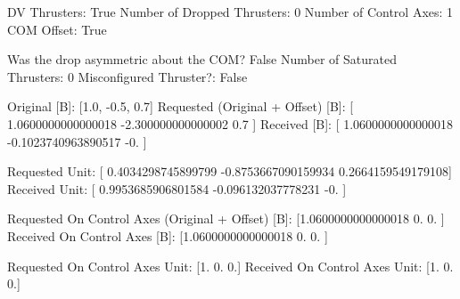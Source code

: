 DV Thrusters:	True
Number of Dropped Thrusters:	0
Number of Control Axes:	1
COM Offset:	True

Was the drop asymmetric about the COM?	False
Number of Saturated Thrusters:	0
Misconfigured Thruster?:	False

Original [B]:	[1.0, -0.5, 0.7]
Requested (Original + Offset) [B]:	[ 1.0600000000000018 -2.300000000000002   0.7               ]
Received [B]:		[ 1.0600000000000018 -0.1023740963890517 -0.                ]

Requested Unit:		[ 0.4034298745899799 -0.8753667090159934  0.2664159549179108]
Received Unit:		[ 0.9953685906801584 -0.096132037778231  -0.                ]

Requested On Control Axes (Original + Offset) [B]:	[1.0600000000000018 0.                 0.                ]
Received On Control Axes [B]:		[1.0600000000000018 0.                 0.                ]

Requested On Control Axes Unit:		[1. 0. 0.]
Received On Control Axes Unit:		[1. 0. 0.]

